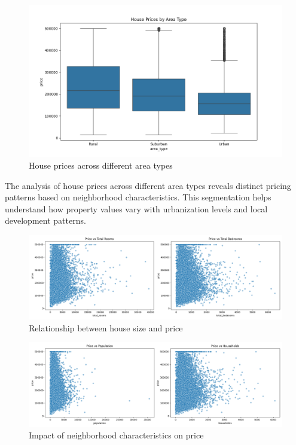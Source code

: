 \documentclass[a4paper, 11pt]{article}
\begin{document}
\begin{figure}[h]
    \centering
    \includegraphics[scale=0.5]{figs/price_by_area_type.png}
    \caption{House prices across different area types}
    \label{fig:price_area}
\end{figure}

The analysis of house prices across different area types reveals distinct pricing patterns based on neighborhood characteristics. This segmentation helps understand how property values vary with urbanization levels and local development patterns.

\begin{figure}[h]
    \centering
    \includegraphics[width=\linewidth]{figs/price_vs_size.png}
    \caption{Relationship between house size and price}
    \label{fig:price_size}
\end{figure}

\begin{figure}[h]
    \centering
    \includegraphics[width=\linewidth]{figs/price_vs_neighborhood.png}
    \caption{Impact of neighborhood characteristics on price}
    \label{fig:price_neighborhood}
\end{figure}
\end{document}
